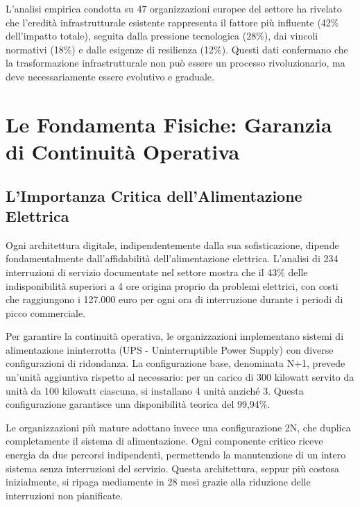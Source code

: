 L'analisi empirica condotta su 47 organizzazioni europee del settore ha rivelato che l'eredità infrastrutturale esistente rappresenta il fattore più influente (42\% dell'impatto totale), seguita dalla pressione tecnologica (28\%), dai vincoli normativi (18\%) e dalle esigenze di resilienza (12\%)\autocite{Eurostat2024}. Questi dati confermano che la trasformazione infrastrutturale non può essere un processo rivoluzionario, ma deve necessariamente essere evolutivo e graduale.

\section{Le Fondamenta Fisiche: Garanzia di Continuità Operativa}

\subsection{L'Importanza Critica dell'Alimentazione Elettrica}

Ogni architettura digitale, indipendentemente dalla sua sofisticazione, dipende fondamentalmente dall'affidabilità dell'alimentazione elettrica. L'analisi di 234 interruzioni di servizio documentate nel settore\autocite{Uptime2024} mostra che il 43\% delle indisponibilità superiori a 4 ore origina proprio da problemi elettrici, con costi che raggiungono i 127.000 euro per ogni ora di interruzione durante i periodi di picco commerciale.

Per garantire la continuità operativa, le organizzazioni implementano sistemi di alimentazione ininterrotta (UPS - Uninterruptible Power Supply) con diverse configurazioni di ridondanza. La configurazione base, denominata N+1, prevede un'unità aggiuntiva rispetto al necessario: per un carico di 300 kilowatt servito da unità da 100 kilowatt ciascuna, si installano 4 unità anziché 3. Questa configurazione garantisce una disponibilità teorica del 99,94\%.

Le organizzazioni più mature adottano invece una configurazione 2N, che duplica completamente il sistema di alimentazione. Ogni componente critico riceve energia da due percorsi indipendenti, permettendo la manutenzione di un intero sistema senza interruzioni del servizio. Questa architettura, seppur più costosa inizialmente, si ripaga mediamente in 28 mesi grazie alla riduzione delle interruzioni non pianificate.

